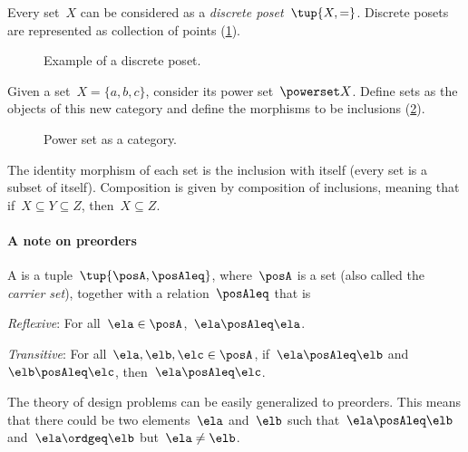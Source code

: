 \begin{example}
  \label{ex:discreteposet}
  Every set~$X$ can be considered as a \emph{discrete poset}~$\tup{X,=}$.
  Discrete posets are represented as collection of points (\cref{fig:discretepos}).

  \begin{figure}[tbh]
    \centering
    \caption{Example of a discrete poset. }
    \label{fig:discretepos}
  \end{figure}

  \begin{example}
    \label{ex:hasseinclusion}
    Given a set~$X=\{a,b,c\}$, consider its power set~$\powerset X$.
    Define sets as the objects of this new category and define the morphisms to be inclusions (\cref{fig:powersetcat}).

    \begin{figure}[h!]
      \begin{center}
      \end{center}
      \caption{Power set as a category.}
      \label{fig:powersetcat}
    \end{figure}

    The identity morphism of each set is the inclusion with itself (every set is a subset of itself).
    Composition is given by composition of inclusions, meaning that if~$X\subseteq Y \subseteq Z$, then~$X\subseteq Z$.
  \end{example}
\end{example}

\paragraph{A note on preorders}
\begin{definition}[Preorder]
  \label{def:preorder}
  A \emph{} is a tuple~$\tup{\posA, \posAleq}$, where~$\posA$ is a set (also called the \emph{carrier set}), together with a relation~$\posAleq$  that is
  \begin{compactenum}
    \item \emph{Reflexive}: For all~$\ela\in \posA$,~$\ela\posAleq \ela$.
    \item \emph{Transitive}: For all~$\ela,\elb,\elc\in \posA$, if~$\ela\posAleq \elb$ and~$\elb\posAleq \elc$, then~$\ela\posAleq \elc$.
  \end{compactenum}
\end{definition}
The theory of design problems can be easily generalized to preorders. This means that there could be two elements~$\ela$ and~$\elb$ such that~$\ela\posAleq \elb$ and~$\ela \ordgeq \elb$ but~$\ela \neq \elb$.


